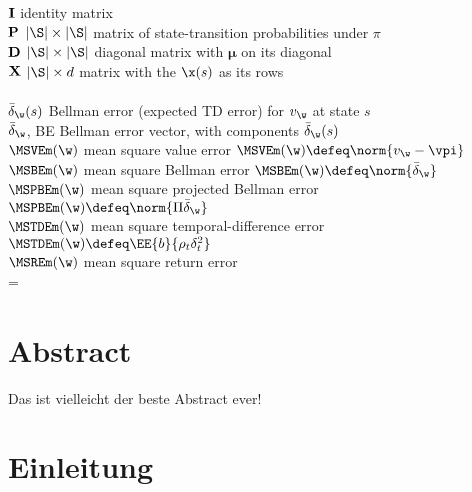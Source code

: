 \documentclass[a4paper,titlepage]{article}
\numberwithin{equation}{section} %
\begin{document}
\>${\bf I}$           \> identity matrix\\
\>${\bf P}$           \> $|\S|\times |\S|$ matrix of state-transition probabilities under $\pi$\\
\>${\bf D}$           \> $|\S|\times |\S|$ diagonal matrix with $\bm\mu$ on its diagonal\\
\>${\bf X}$           \> $|\S|\times d$ matrix with the $\x(s)$ as its rows\\
\\
\>$\bar\delta_\w(s)$  \> Bellman error (expected TD error) for $v_\w$ at state $s$\\
\>$\bar\delta_\w$, BE \> Bellman error vector, with components $\bar\delta_\w(s)$\\
\>$\MSVEm(\w)$        \> mean square value error $\MSVEm(\w)\defeq\norm{v_\w-\vpi}$\\
\>$\MSBEm(\w)$        \> mean square Bellman error $\MSBEm(\w)\defeq\norm{\bar\delta_\w}$\\
\>$\MSPBEm(\w)$       \> mean square projected Bellman error $\MSPBEm(\w)\defeq\norm{\Pi\bar\delta_\w}$\\
\>$\MSTDEm(\w)$       \> mean square temporal-difference error $\MSTDEm(\w)\defeq\EE{b}{\rho_t\delta_t^2}$ \\
\>$\MSREm(\w)$        \> mean square return error\\



\emergencystretch=\maxdimen
{}

\newpage

\section*{\hfil Abstract\hfil}
\begin{changemargin}{4cm}{4cm}
	Das ist vielleicht der beste Abstract ever!
\end{changemargin}
\section{Einleitung}
\newpage

\end{document}
